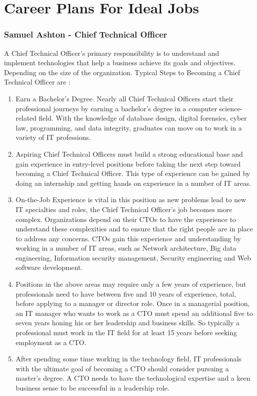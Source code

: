 \documentclass[11pt, oneside, a4paper, titlepage]{article}
\begin{document}
\section{Career Plans For Ideal Jobs}
\subsubsection{Samuel Ashton - Chief Technical Officer}
A Chief Technical Officer’s primary responsibility is to understand and implement technologies that help a business achieve its goals and objectives. Depending on the size of the organization. Typical Steps to Becoming a Chief Technical Officer are : 
\begin{enumerate}
	\item
    Earn a Bachelor’s Degree. Nearly all Chief Technical Officers start their professional journeys by earning a bachelor’s degree in a computer science-related field. With the knowledge of database design, digital forensics, cyber law, programming, and data integrity, graduates can move on to work in a variety of IT professions.  
    \item
    Aspiring Chief Technical Officers must build a strong educational base and gain experience in entry-level positions before taking the next step toward becoming a Chief Technical Officer. This type of experience can be gained by doing an internship and getting hands on experience in a number of IT areas. 
    \item
    On-the-Job Experience is vital in this position as new problems lead to new IT specialties and roles, the Chief Technical Officer’s job becomes more complex. Organizations depend on their CTOs to have the experience to understand these complexities and to ensure that the right people are in place to address any concerns. CTOs gain this experience and understanding by working in a number of IT areas, such as Network architecture, Big data engineering, Information security management, Security engineering and Web software development. 
    \item
    Positions in the above areas may require only a few years of experience, but professionals need to have between five and 10 years of experience, total, before applying to a manager or director role. Once in a managerial position, an IT manager who wants to work as a CTO must spend an additional five to seven years honing his or her leadership and business skills. So typically a professional must work in the IT field for at least 15 years before seeking employment as a CTO.  
    \item
    After spending some time working in the technology field, IT professionals with the ultimate goal of becoming a CTO should consider pursuing a master’s degree. A CTO needs to have the technological expertise and a keen business sense to be successful in a leadership role.  
\end{enumerate}
\end{document}
